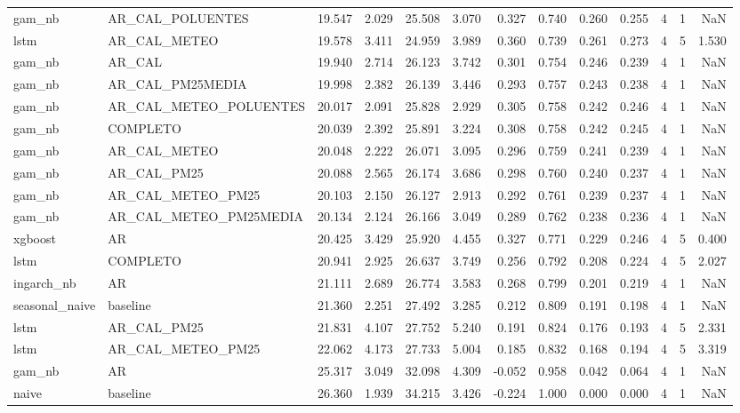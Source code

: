 \begin{tabular}{llrrrrrrrrrrr}
gam_nb & AR_CAL_POLUENTES & 19.547 & 2.029 & 25.508 & 3.070 & 0.327 & 0.740 & 0.260 & 0.255 & 4 & 1 & NaN \\
lstm & AR_CAL_METEO & 19.578 & 3.411 & 24.959 & 3.989 & 0.360 & 0.739 & 0.261 & 0.273 & 4 & 5 & 1.530 \\
gam_nb & AR_CAL & 19.940 & 2.714 & 26.123 & 3.742 & 0.301 & 0.754 & 0.246 & 0.239 & 4 & 1 & NaN \\
gam_nb & AR_CAL_PM25MEDIA & 19.998 & 2.382 & 26.139 & 3.446 & 0.293 & 0.757 & 0.243 & 0.238 & 4 & 1 & NaN \\
gam_nb & AR_CAL_METEO_POLUENTES & 20.017 & 2.091 & 25.828 & 2.929 & 0.305 & 0.758 & 0.242 & 0.246 & 4 & 1 & NaN \\
gam_nb & COMPLETO & 20.039 & 2.392 & 25.891 & 3.224 & 0.308 & 0.758 & 0.242 & 0.245 & 4 & 1 & NaN \\
gam_nb & AR_CAL_METEO & 20.048 & 2.222 & 26.071 & 3.095 & 0.296 & 0.759 & 0.241 & 0.239 & 4 & 1 & NaN \\
gam_nb & AR_CAL_PM25 & 20.088 & 2.565 & 26.174 & 3.686 & 0.298 & 0.760 & 0.240 & 0.237 & 4 & 1 & NaN \\
gam_nb & AR_CAL_METEO_PM25 & 20.103 & 2.150 & 26.127 & 2.913 & 0.292 & 0.761 & 0.239 & 0.237 & 4 & 1 & NaN \\
gam_nb & AR_CAL_METEO_PM25MEDIA & 20.134 & 2.124 & 26.166 & 3.049 & 0.289 & 0.762 & 0.238 & 0.236 & 4 & 1 & NaN \\
xgboost & AR & 20.425 & 3.429 & 25.920 & 4.455 & 0.327 & 0.771 & 0.229 & 0.246 & 4 & 5 & 0.400 \\
lstm & COMPLETO & 20.941 & 2.925 & 26.637 & 3.749 & 0.256 & 0.792 & 0.208 & 0.224 & 4 & 5 & 2.027 \\
ingarch_nb & AR & 21.111 & 2.689 & 26.774 & 3.583 & 0.268 & 0.799 & 0.201 & 0.219 & 4 & 1 & NaN \\
seasonal_naive & baseline & 21.360 & 2.251 & 27.492 & 3.285 & 0.212 & 0.809 & 0.191 & 0.198 & 4 & 1 & NaN \\
lstm & AR_CAL_PM25 & 21.831 & 4.107 & 27.752 & 5.240 & 0.191 & 0.824 & 0.176 & 0.193 & 4 & 5 & 2.331 \\
lstm & AR_CAL_METEO_PM25 & 22.062 & 4.173 & 27.733 & 5.004 & 0.185 & 0.832 & 0.168 & 0.194 & 4 & 5 & 3.319 \\
gam_nb & AR & 25.317 & 3.049 & 32.098 & 4.309 & -0.052 & 0.958 & 0.042 & 0.064 & 4 & 1 & NaN \\
naive & baseline & 26.360 & 1.939 & 34.215 & 3.426 & -0.224 & 1.000 & 0.000 & 0.000 & 4 & 1 & NaN \\
\bottomrule
\end{tabular}
